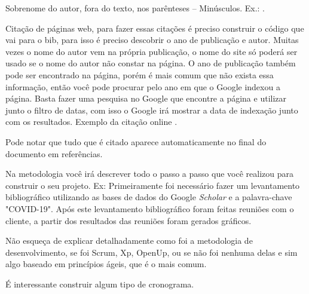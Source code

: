 Sobrenome do autor, fora do texto, nos parênteses – Minúsculos.
Ex.: \cite[p. 20]{paulino2006analise}.

Citação de páginas web, para fazer essas citações é preciso construir o código que vai para o bib, para isso é preciso descobrir o ano de publicação e autor. Muitas vezes o nome do autor vem na própria publicação, o nome do site só poderá ser usado se o nome do autor não constar na página. O ano de publicação também pode ser encontrado na página, porém é mais comum que não exista essa informação, então você pode procurar pelo ano em que o Google indexou a página. Basta fazer uma pesquisa no Google que encontre a página e utilizar junto o filtro de datas, com isso o Google irá mostrar a data de indexação junto com os resultados. Exemplo da citação online \cite{refABNTSite}.


Pode notar que tudo que é citado aparece automaticamente no final do documento em referências.




\label{sec:metodologia}

Na metodologia você irá descrever todo o passo a passo que você realizou para construir o seu projeto.
Ex: Primeiramente foi necessário fazer um levantamento bibliográfico utilizando as bases de dados do Google \textit{Scholar} e a palavra-chave "COVID-19". Após este levantamento bibliográfico foram feitas reuniões com o cliente, a partir dos resultados das reuniões foram gerados gráficos.

Não esqueça de explicar detalhadamente como foi a metodologia de desenvolvimento, se foi Scrum, Xp, OpenUp, ou se não foi nenhuma delas e sim algo baseado em princípios ágeis, que é o mais comum.

É interessante construir algum tipo de cronograma.









